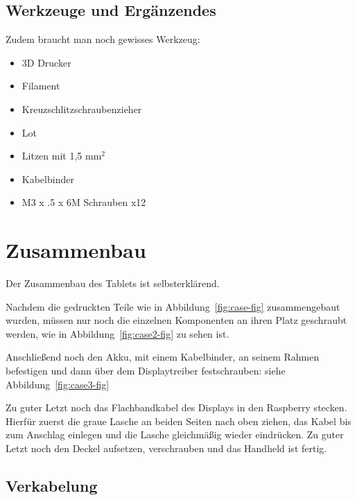 \subsection{Werkzeuge und Ergänzendes}
Zudem braucht man noch gewisses Werkzeug:
\begin{itemize}
\item 3D Drucker 
\item Filament  
\item Kreuzschlitzschraubenzieher 
\item Lot 
\item Litzen mit 1,5 mm$^2$
\item Kabelbinder
\item M3 x .5 x 6M Schrauben x12
\end{itemize}

\section{Zusammenbau}

Der Zusammenbau des Tablets ist selbsterklärend.


Nachdem die gedruckten Teile wie in Abbildung~\ref{fig:case-fig} zusammengebaut wurden, müssen nur noch die einzelnen Komponenten an ihren Platz geschraubt werden, wie in Abbildung~\ref{fig:case2-fig} zu sehen ist.


Anschließend noch den Akku, mit einem Kabelbinder, an seinem Rahmen befestigen und dann über dem Displaytreiber festschrauben: siehe Abbildung~\ref{fig:case3-fig}


Zu guter Letzt noch das Flachbandkabel des Displays in den Raspberry stecken. Hierfür zuerst die graue Lasche an beiden Seiten nach oben ziehen, das Kabel bis zum Anschlag einlegen und die Lasche gleichmäßig wieder eindrücken. Zu guter Letzt noch den Deckel aufsetzen, verschrauben und das Handheld ist fertig.


\subsection{Verkabelung}

